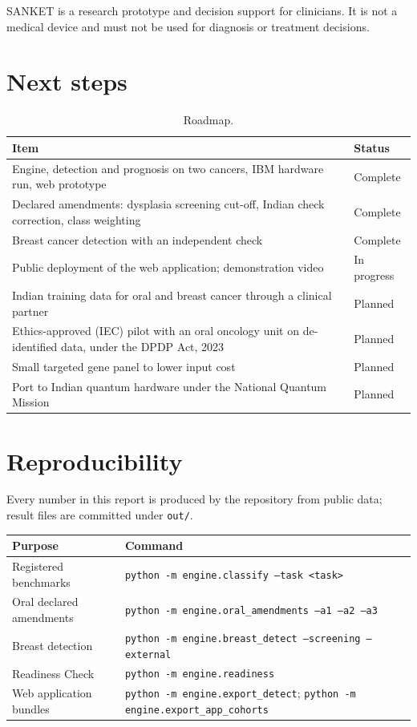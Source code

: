 \documentclass[11pt,a4paper]{article}
\begin{document}
SANKET is a research prototype and decision support for clinicians. It is not a medical device and must not be used for diagnosis or treatment decisions.

\section{Next steps}
\begin{table}[H]
\centering
\caption{Roadmap.}
\begin{tabularx}{\textwidth}{@{}Y l@{}}
\toprule
\textbf{Item} & \textbf{Status} \\
\midrule
Engine, detection and prognosis on two cancers, IBM hardware run, web prototype & Complete \\
Declared amendments: dysplasia screening cut-off, Indian check correction, class weighting & Complete \\
Breast cancer detection with an independent check & Complete \\
Public deployment of the web application; demonstration video & In progress \\
Indian training data for oral and breast cancer through a clinical partner & Planned \\
Ethics-approved (IEC) pilot with an oral oncology unit on de-identified data, under the DPDP Act, 2023 & Planned \\
Small targeted gene panel to lower input cost & Planned \\
Port to Indian quantum hardware under the National Quantum Mission & Planned \\
\bottomrule
\end{tabularx}
\end{table}

\appendix
\section{Reproducibility}
Every number in this report is produced by the repository from public data; result files are committed under \texttt{out/}.

\begin{table}[H]
\centering
\small
\begin{tabularx}{\textwidth}{@{}l Y@{}}
\toprule
\textbf{Purpose} & \textbf{Command} \\
\midrule
Registered benchmarks & \texttt{python -m engine.classify --task <task>} \\
Oral declared amendments & \texttt{python -m engine.oral\_amendments --a1 --a2 --a3} \\
Breast detection & \texttt{python -m engine.breast\_detect --screening --external} \\
Readiness Check & \texttt{python -m engine.readiness} \\
Web application bundles & \texttt{python -m engine.export\_detect}; \texttt{python -m engine.export\_app\_cohorts} \\
\bottomrule
\end{tabularx}
\end{table}
\end{document}

